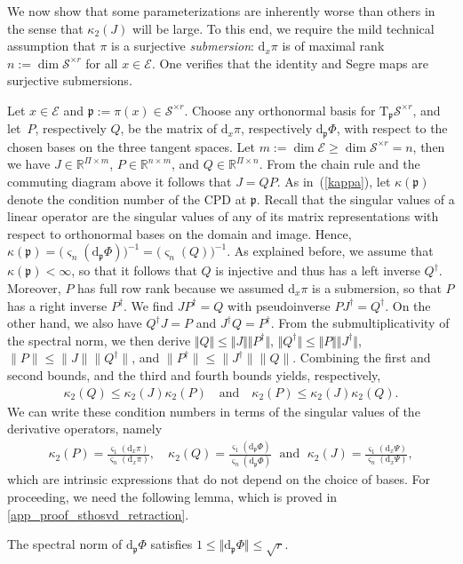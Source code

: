 \documentclass[a4paper,10pt,final]{siamart1116}
\newcommand{\tuple}[1]{\mathfrak{#1}}
\newcommand{\Var}[1]{\mathcal{#1}}
\newcommand{\Tang}[2]{\mathrm{T}_{#1} {#2}}
\newcommand{\deriv}[2]{\mathrm{d}_{#1}#2}
\newcommand{\R}{\mathbb{R}}
\newcommand{\refeqn}[1]{{(\ref{#1})}}
\newcommand{\refapp}[1]{{\cref{#1}}}
\numberwithin{equation}{section}
\numberwithin{figure}{section}
\numberwithin{table}{section}
\numberwithin{theorem}{section}
\begin{document}
We now show that some parameterizations are inherently worse than others in the sense that $\kappa_2(J)$ will be large. To this end, we require the mild technical assumption that $\pi$ is a surjective \emph{submersion}: $\deriv{x}{\pi}$ is of maximal rank $n := \dim \Var{S}^{\times r}$ for all $x \in \Var{E}$. One verifies that the identity and Segre maps are surjective submersions.

Let $x\in \Var{E}$ and $\tuple p:=\pi(x)\in\Var{S}^{\times r}$.
Choose any orthonormal basis for $\Tang{\tuple{p}}{\Var{S}^{\times r}}$, and let~$P$, respectively $Q$,
be the matrix of $\deriv{x}{\pi}$, respectively $\deriv{\tuple{p}}{\Phi}$, with respect to the chosen bases on the three tangent spaces. Let $m := \dim \Var{E} \ge \dim \Var{S}^{\times r} = n$, then we have $J \in \R^{\Pi \times m}$, $P \in \R^{n \times m}$, and $Q \in \R^{\Pi \times n}$.
From the chain rule and the commuting diagram above it follows that $J = Q P$.
As in~\refeqn{kappa}, let $\kappa(\tuple p)$ denote the condition number of the CPD at $\tuple p$. Recall that the singular values of a linear operator are the singular values of any of its matrix representations with respect to orthonormal bases on the domain and image. Hence,
\(
 \kappa(\tuple{p}) = \bigl(\varsigma_n ( \deriv{\tuple{p}}{\Phi} ) \bigr)^{-1} = \bigl(\varsigma_n ( Q ) \bigr)^{-1}.
\)
As explained before, we assume that $\kappa(\tuple p) <\infty$,
so that it follows that $Q$ is injective and thus has a left inverse $Q^\dagger$.
Moreover, $P$ has full row rank because we assumed $\deriv{x}{\pi}$ is a submersion, so that $P$ has a right inverse $P^\dagger$. We find $JP^\dagger = Q$ with pseudoinverse $PJ^\dagger = Q^\dagger$. On the other hand, we also have $Q^\dagger J = P$ and $J^\dagger Q = P^\dagger$. From the submultiplicativity of the spectral norm, we then derive
$\Vert Q\Vert \leq \Vert J\Vert\Vert P^\dagger\Vert$,
$\Vert Q^\dagger\Vert \leq \Vert P\Vert\Vert J^\dagger\Vert$,
$\| P \| \le \| J \| \|Q^\dagger\|$, and
$\| P^\dagger \| \le \|J^\dagger\| \|Q\|$.
Combining the first and second bounds, and the third and fourth bounds yields, respectively,
\begin{align} \label{eqn_lower_bound}
\kappa_2(Q) \le \kappa_2(J) \kappa_2( P )
\quad\text{and}\quad
\kappa_2( P ) \le \kappa_2(J) \kappa_2(Q).
\end{align}
We can write these condition numbers in terms of the singular values of the derivative operators, namely
\begin{align} \label{eqn_kappa_intrinsic}
\kappa_2(P) = \frac{\varsigma_1(\deriv{x}{\pi})}{\varsigma_n(\deriv{x}{\pi})},
\quad
\kappa_2(Q) = \frac{\varsigma_1(\deriv{\tuple{p}}{\Phi})}{\varsigma_n(\deriv{\tuple{p}}{\Phi})}
\;\text{ and }\;
\kappa_2(J) = \frac{\varsigma_1(\deriv{x}{\Psi})}{\varsigma_n(\deriv{x}{\Psi})},
\end{align}
which are intrinsic expressions that do not depend on the choice of bases.
For proceeding, we need the following lemma, which is proved in \refapp{app_proof_sthosvd_retraction}.
\begin{lemma}\label{norm_of_phi} The spectral norm of $\deriv{\tuple p}{\Phi}$ satisfies
$1\leq \Vert \deriv{\tuple p}{\Phi}\Vert \le \sqrt{r}$.
\end{lemma}
\end{document}
